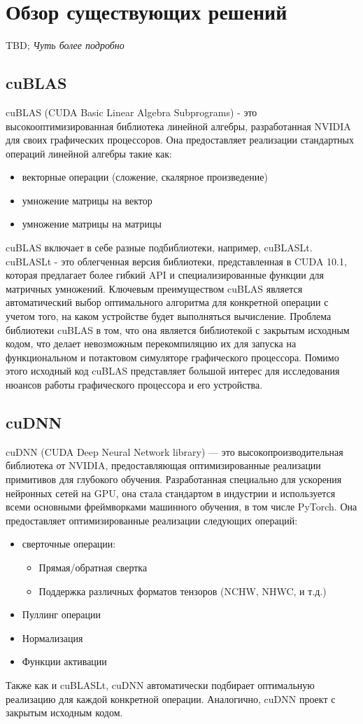 
\section{Обзор существующих решений}
TBD; \textit{Чуть более подробно}
\subsection{cuBLAS}
cuBLAS (CUDA Basic Linear Algebra Subprograms) - это высокооптимизированная библиотека линейной алгебры,
разработанная NVIDIA для своих графических процессоров. Она предоставляет реализации стандартных операций линейной алгебры такие как:
\begin{itemize}
    \item векторные операции (сложение, скалярное произведение)
    \item умножение матрицы на вектор
    \item умножение матрицы на матрицы
\end{itemize}
cuBLAS включает в себе разные подбиблиотеки, например, cuBLASLt. cuBLASLt - это облегченная версия библиотеки, представленная в
CUDA 10.1, которая предлагает более гибкий API и специализированные функции для матричных умножений.
Ключевым преимуществом cuBLAS является автоматический выбор оптимального алгоритма для конкретной операции с учетом того, на каком
устройстве будет выполняться вычисление.
Проблема библиотеки cuBLAS в том, что она является библиотекой с закрытым исходным кодом, что делает невозможным перекомпиляцию
их для запуска на функциональном и потактовом симуляторе графического процессора. Помимо этого исходный код cuBLAS представляет
большой интерес для исследования нюансов работы графического процессора и его устройства.

\subsection{cuDNN}
cuDNN (CUDA Deep Neural Network library) — это высокопроизводительная библиотека от NVIDIA, предоставляющая оптимизированные реализации примитивов
для глубокого обучения. Разработанная специально для ускорения нейронных сетей на GPU, она стала стандартом в индустрии и используется всеми
основными фреймворками машинного обучения, в том числе PyTorch.
Она предоставляет оптимизированные реализации следующих операций:
\begin{itemize}
    \item сверточные операции:
    \begin{itemize}
        \item Прямая/обратная свертка
        \item Поддержка различных форматов тензоров (NCHW, NHWC, и т.д.)
    \end{itemize}
    \item Пуллинг операции
    \item Нормализация
    \item Функции активации
\end{itemize}

Также как и cuBLASLt, cuDNN автоматически подбирает оптимальную реализацию для каждой конкретной операции.
Аналогично, cuDNN проект с закрытым исходным кодом.

